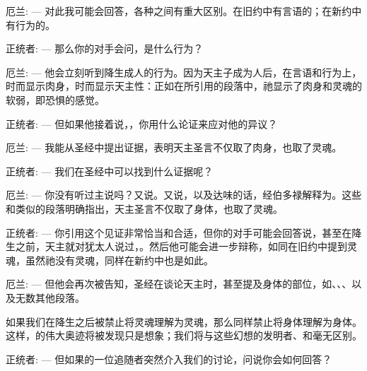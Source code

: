 厄兰: — 对此我可能会回答，各种之间有重大区别。在旧约中有言语的；在新约中有行为的。\par

正统者: — 那么你的对手会问，是什么行为？\par

厄兰: — 他会立刻听到降生成人的行为。因为天主子成为人后，在言语和行为上，时而显示肉身，时而显示天主性：正如在所引用的段落中，祂显示了肉身和灵魂的软弱，即恐惧的感觉。\par

正统者: — 但如果他接着说，，你用什么论证来应对他的异议？\par

厄兰: — 我能从圣经中提出证据，表明天主圣言不仅取了肉身，也取了灵魂。\par

正统者: — 我们在圣经中可以找到什么证据呢？\par

厄兰: — 你没有听过主说吗？又说。又说，以及达味的话，经伯多禄解释为。这些和类似的段落明确指出，天主圣言不仅取了身体，也取了灵魂。\par

正统者: — 你引用这个见证非常恰当和合适，但你的对手可能会回答说，甚至在降生之前，天主就对犹太人说过，。然后他可能会进一步辩称，如同在旧约中提到灵魂，虽然祂没有灵魂，同样在新约中也是如此。\par

厄兰: — 但他会再次被告知，圣经在谈论天主时，甚至提及身体的部位，如、、、以及无数其他段落。\par

如果我们在降生之后被禁止将灵魂理解为灵魂，那么同样禁止将身体理解为身体。这样，的伟大奥迹将被发现只是想象；我们将与这些幻想的发明者、和毫无区别。\par

正统者: — 但如果的一位追随者突然介入我们的讨论，问说你会如何回答？\par

